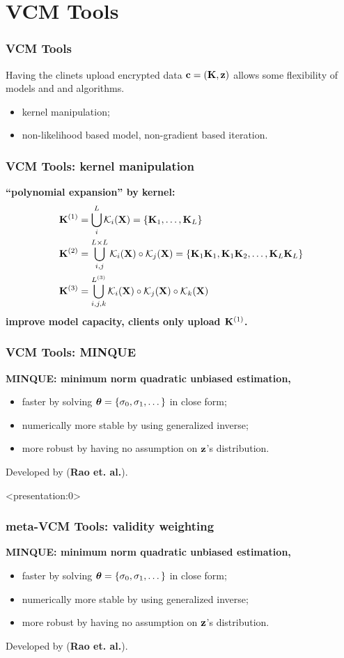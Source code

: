\documentclass{beamer}
\newcommand{\kn}{\mathcal{K}}                         %
\begin{document}
\section{VCM Tools}
\begin{frame}\frametitle{VCM Tools}
  Having the clinets upload encrypted data $\mathbf{c}=(\mathbf{K}, \mathbf{z})$ allows
  some flexibility of models and and algorithms.
  \begin{itemize}
  \item kernel manipulation;
  \item non-likelihood based model, non-gradient based iteration.
  \end{itemize}
\end{frame}
\begin{frame}\frametitle{VCM Tools: kernel manipulation}
  \textbf{``polynomial expansion'' by kernel:}
  \begin{align*}
    \xk^{(1)} & = \bigcup_{i}^L \kn_i(\xx) = \{\xk_1, \dots, \xk_L\} \\
    \xk^{(2)} & = \bigcup_{i,j}^{L \times L} \kn_i(\xx) \circ \kn_j(\xx) = \{\xk_1\xk_1, \xk_1\xk_2, \dots, \xk_L\xk_L\} \\
    \xk^{(3)} & = \bigcup_{i,j,k}^{L^{(3)}}  \kn_i(\xx) \circ \kn_j(\xx) \circ \kn_k(\xx)
  \end{align*}
  {\color{blue}\textbf{improve model capacity, clients only upload $\mathbf{K}^{(1)}$.}}
\end{frame}
\begin{frame}\frametitle{VCM Tools: \textbf{MINQUE}}
  \textbf{MINQUE: minimum norm quadratic unbiased estimation,}
  \begin{itemize}
  \item faster by solving $\boldsymbol{\theta}=\{\sigma_0, \sigma_1, \dots \}$ in
    close form;
  \item numerically more stable by using generalized inverse;
  \item more robust by having no assumption on $\mathbf{z}$'s distribution.
  \end{itemize}
  Developed by (\textbf{Rao et. al.}).
\end{frame}
\begin{frame}<presentation:0> %
  \frametitle{meta-VCM Tools: \textbf{validity weighting}} %
  \textbf{MINQUE: minimum norm quadratic unbiased estimation,}
  \begin{itemize}
  \item faster by solving $\boldsymbol{\theta}=\{\sigma_0, \sigma_1, \dots \}$ in
    close form;
  \item numerically more stable by using generalized inverse;
  \item more robust by having no assumption on $\mathbf{z}$'s distribution.
  \end{itemize}
  Developed by (\textbf{Rao et. al.}).
\end{frame}
\end{document}
